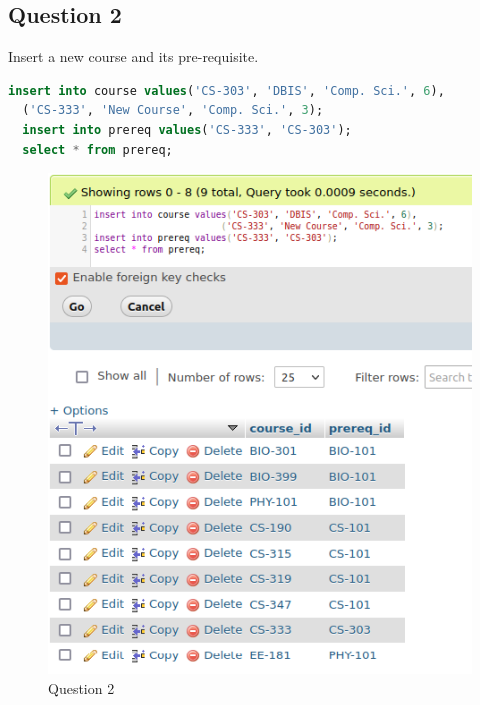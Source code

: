 \documentclass{article}
\begin{document}
\newpage

\subsection{Question 2}
Insert a new course and its pre-requisite.
\begin{lstlisting}[language=sql]
  insert into course values('CS-303', 'DBIS', 'Comp. Sci.', 6),
  ('CS-333', 'New Course', 'Comp. Sci.', 3);
  insert into prereq values('CS-333', 'CS-303');
  select * from prereq;
\end{lstlisting}
\begin{figure}[!ht]
  \begin{center}
  \includegraphics[scale=1]{Q8_2.png}
  \caption{Question 2}
  \end{center}
\end{figure}

\newpage
\end{document}
